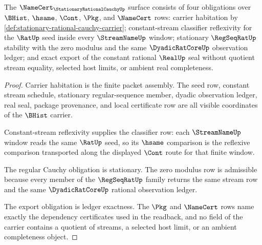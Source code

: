 \begin{theorem}
\label{thm:stationary-rational-cauchy-namecert-obligations}
The $\NameCert_{\StationaryRationalCauchyUp}$ surface consists of four obligations over $\BHist$, $\hsame$, $\Cont$, $\Pkg$, and $\NameCert$ rows: carrier habitation by \autoref{def:stationary-rational-cauchy-carrier}; constant-stream classifier reflexivity for the $\RatUp$ seed inside every $\StreamNameUp$ window; stationary $\RegSeqRatUp$ stability with the zero modulus and the same $\DyadicRatCoreUp$ observation ledger; and exact export of the constant rational $\RealUp$ seal without quotient stream equality, selected host limits, or ambient real completeness.
\end{theorem}
\begin{proof}
Carrier habitation is the finite packet assembly. The seed row, constant stream schedule, stationary regular-sequence member, dyadic observation ledger, real seal, package provenance, and local certificate row are all visible coordinates of the $\BHist$ carrier.

Constant-stream reflexivity supplies the classifier row: each $\StreamNameUp$ window reads the same $\RatUp$ seed, so its $\hsame$ comparison is the reflexive comparison transported along the displayed $\Cont$ route for that finite window.

The regular Cauchy obligation is stationary. The zero modulus row is admissible because every member of the $\RegSeqRatUp$ family returns the same stream row and the same $\DyadicRatCoreUp$ rational observation ledger.

The export obligation is ledger exactness. The $\Pkg$ and $\NameCert$ rows name exactly the dependency certificates used in the readback, and no field of the carrier contains a quotient of streams, a selected host limit, or an ambient completeness object.
\end{proof}

